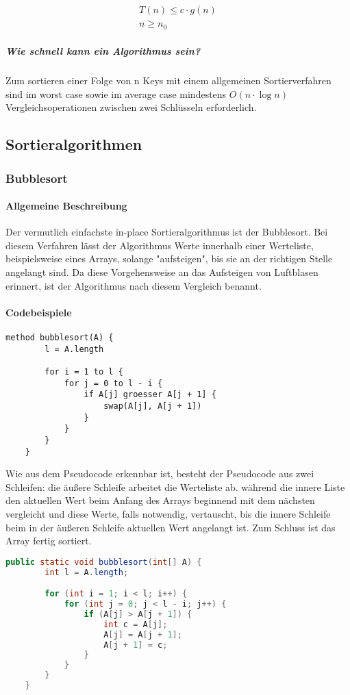 \documentclass{article}
\begin{document}
	\begin{align*}
		T(n) \leq c \cdot g(n) \\
		n \geq n_0
	\end{align*}

	\subparagraph{Wie schnell kann ein Algorithmus sein?}
	Zum sortieren einer Folge von n Keys mit einem allgemeinen Sortierverfahren sind im worst case sowie im average case mindestens \textit{$O(n \cdot \log{n})$} Vergleichsoperationen zwischen zwei Schlüsseln erforderlich.

	\subsection{Sortieralgorithmen}
	\subsubsection{Bubblesort}
	\paragraph{Allgemeine Beschreibung}
	Der vermutlich einfachste in-place Sortieralgorithmus ist der Bubblesort. Bei diesem Verfahren lässt der Algorithmus Werte innerhalb einer Werteliste, beispielsweise eines Arrays, solange "aufsteigen", bis sie an der richtigen Stelle angelangt sind. Da diese Vorgehensweise an das Aufsteigen von Luftblasen erinnert, ist der Algorithmus nach diesem Vergleich benannt.

	\paragraph{Codebeispiele}
	\begin{lstlisting}[caption=Der Bubblesort-Algorithmus in einfachem Pseudocode]
	method bubblesort(A) {
		l = A.length

		for i = 1 to l {
			for j = 0 to l - i {
				if A[j] groesser A[j + 1] {
					swap(A[j], A[j + 1])
				}
			}
		}
	}
	\end{lstlisting}

	Wie aus dem Pseudocode erkennbar ist, besteht der Pseudocode aus zwei Schleifen: die äußere Schleife arbeitet die Werteliste ab. während die innere Liste den aktuellen Wert beim Anfang des Arrays beginnend mit dem nächsten vergleicht und diese Werte, falls notwendig, vertauscht, bis die innere Schleife beim in der äußeren Schleife aktuellen Wert angelangt ist. Zum Schluss ist das Array fertig sortiert.

	
	\begin{lstlisting}[language=Java, caption=Der Bubblesort-Algorithmus in Java]
	public static void bubblesort(int[] A) {
		int l = A.length;

		for (int i = 1; i < l; i++) {
			for (int j = 0; j < l - i; j++) {
				if (A[j] > A[j + 1]) {
					int c = A[j];
					A[j] = A[j + 1];
					A[j + 1] = c;
				}
			}
		}
	}
	\end{lstlisting}
\end{document}
